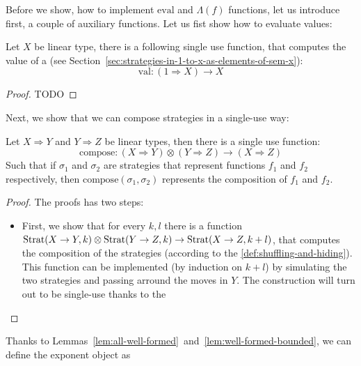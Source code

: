 Before we show, how to implement $\text{eval}$ and $\Lambda(f)$ functions, 
let us introduce first, a couple of auxiliary functions.
Let us fist show how to evaluate values:
\begin{lemma}
    Let $X$ be linear type, there is a following single use function, that 
    computes the value of a (see Section~\ref{sec:strategies-in-1-to-x-as-elements-of-sem-x}):
    \[\text{val}: (1 \Rightarrow X) \to X\]
\end{lemma}
\begin{proof}
    TODO 
\end{proof}

Next, we show that we can compose strategies in a single-use way:
\begin{lemma}
    Let $X \Rightarrow Y$ and $Y \Rightarrow Z$ be linear types, then there is a single use function:
    \[\text{compose} : (X \Rightarrow Y) \otimes (Y \Rightarrow Z) \to (X \Rightarrow Z)\]
    Such that if $\sigma_1$ and $\sigma_2$ are strategies that represent functions $f_1$ and $f_2$ respectively,
    then $\text{compose}(\sigma_1, \sigma_2)$ represents the composition of $f_1$ and $f_2$.
\end{lemma}
\begin{proof}
    The proofs has two steps:
    \begin{itemize}
        \item First, we show that for every $k, l$ there is a function
              $\text{Strat}(X \to Y, k) \otimes \text{Strat}(Y \to Z, k) \to \text{Strat}(X \to Z, k + l)$, 
              that computes the composition of the strategies (according to the \ref{def:shuffling-and-hiding}). 
              This function can be implemented (by induction on $k + l$) by simulating the two strategies 
              and passing arround the moves in $Y$. The construction will turn out to be single-use 
              thanks to the 
    \end{itemize}
\end{proof}


Thanks to Lemmas~\ref{lem:all-well-formed}~and~\ref{lem:well-formed-bounded}, we can define the exponent object 
as 




